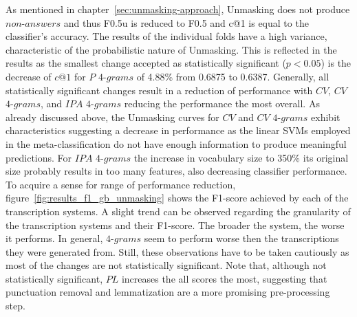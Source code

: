 As mentioned in chapter~\ref{sec:unmasking-approach}, Unmasking does not produce $non$-$answers$ and thus F0.5u is reduced to F0.5 and c@1 is equal to the classifier's accuracy.
The results of the individual folds have a high variance, characteristic of the probabilistic nature of Unmasking.
This is reflected in the results as the smallest change accepted as statistically significant ($p<0.05$) is the decrease of $c@1$ for $P$ $4$-$grams$ of 4.88\% from 0.6875 to 0.6387.
Generally, all statistically significant changes result in a reduction of performance with $CV$, $CV$ $4$-$grams$, and $IPA$ $4$-$grams$ reducing the performance the most overall.
As already discussed above, the Unmasking curves for $CV$ and $CV$ $4$-$grams$ exhibit characteristics suggesting a decrease in performance as the linear SVMs employed in the meta-classification do not have enough information to produce meaningful predictions.
For $IPA$ $4$-$grams$ the increase in vocabulary size to 350\% its original size probably results in too many features, also decreasing classifier performance.
To acquire a sense for range of performance reduction, figure~\ref{fig:results_f1_gb_unmasking} shows the F1-score achieved by each of the transcription systems.
A slight trend can be observed regarding the granularity of the transcription systems and their F1-score.
The broader the system, the worse it performs.
In general, $4$-$grams$ seem to perform worse then the transcriptions they were generated from.
Still, these observations have to be taken cautiously as most of the changes are not statistically significant.
Note that, although not statistically significant, $PL$ increases the all scores the most, suggesting that punctuation removal and lemmatization are a more promising pre-processing step.\\


